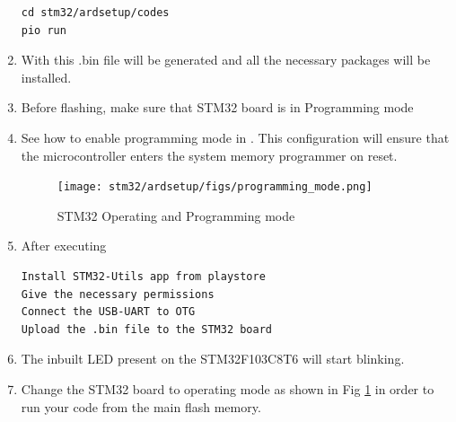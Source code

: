 \begin{enumerate}[label=\arabic*.,ref=\theenumi]
\begin{lstlisting}
cd stm32/ardsetup/codes
pio run
\end{lstlisting}
\item With this .bin file will be generated and all the necessary packages will be installed.
\item Before flashing, make sure that STM32 board is in Programming mode
\item See how to enable programming mode in . This configuration will ensure that the microcontroller enters the system memory programmer on reset.
\begin{figure}[!htb]
\begin{center}
\texttt{[image: stm32/ardsetup/figs/programming\_mode.png]}
\end{center}
\caption{STM32 Operating and Programming mode}
\label{fig:programming_mode}
\end{figure}
\item After executing 
\begin{lstlisting}
Install STM32-Utils app from playstore
Give the necessary permissions
Connect the USB-UART to OTG
Upload the .bin file to the STM32 board
\end{lstlisting}
\item The inbuilt LED present on the STM32F103C8T6 will start blinking.
\item Change the STM32 board to operating mode as shown in Fig \ref{fig:programming_mode} in order to run your code from the main flash memory.
\end{enumerate}



